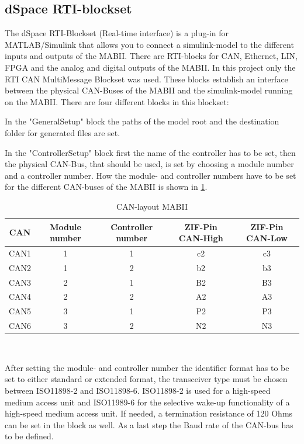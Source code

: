 \documentclass[ExampleMasters.tex]{subfiles}
\begin{document}
\subsection{dSpace RTI-blockset}
The dSpace RTI-Blockset (Real-time interface) is a plug-in for MATLAB/Simulink that allows you to connect a simulink-model to the different inputs and outputs of the MABII. There are RTI-blocks for CAN, Ethernet, LIN, FPGA and the analog and digital outputs of the MABII.
In this project only the RTI CAN MultiMessage Blockset was used. These blocks establish an interface between the physical CAN-Buses of the MABII and the simulink-model running on the MABII. There are four different blocks in this blockset: 

In the "GeneralSetup" block the paths of the model root and the destination folder for generated files are set. 

In the "ControllerSetup" block first the name of the controller has to be set, then the physical CAN-Bus, that should be used, is set by choosing a module number and a controller number. How the module- and controller numbers have to be set for the different CAN-buses of the MABII is shown in \ref{tab:CAN-layout}.
\begin{table}[h]
	\centering
	\caption{CAN-layout MABII}
	\label{tab:CAN-layout}
	\begin{tabular}{c|c|c|c|c|}
		CAN   & Module number & Controller number & ZIF-Pin CAN-High & ZIF-Pin CAN-Low  \\ \hline
		CAN1     &       1 & 1  & c2 & c3         \\
		CAN2   &      1 & 2  & b2 & b3    \\
		CAN3 &      2 & 1 & B2 & B3        \\
		CAN4& 2 & 2 & A2 & A3  \\
		CAN5& 3 & 1 & P2 & P3 \\
		CAN6& 3 & 2 & N2 & N3 \\
	\end{tabular} \\
\end{table}

After setting the module- and controller number the identifier format has to be set to either standard or extended format, the transceiver type must be chosen between ISO11898-2 and ISO11898-6. ISO11898-2 is used for a high-speed medium access unit and ISO11989-6 for the selective wake-up functionality of a high-speed medium access unit. If needed, a termination resistance of 120 Ohms can be set in the block as well. As a last step the Baud rate of the CAN-bus has to be defined.
\end{document}
